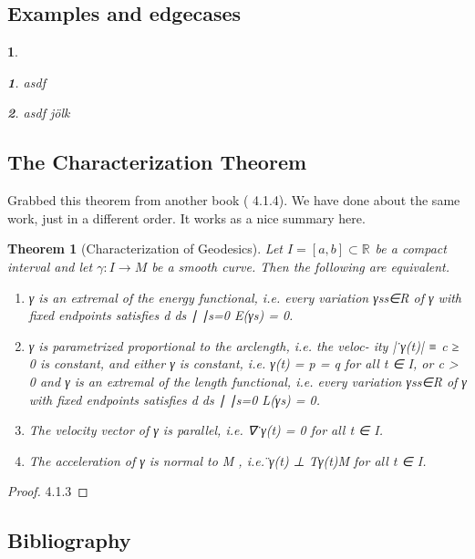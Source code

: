 \documentclass{article}
\newtheorem{thm}{Theorem}
\newtheorem{proof}{Proof}
\newtheorem*{variants}{}
\newtheorem*{var}{}
\renewcommand{\Rn}[1][n]{\mathbb{R}^{#1}}
\begin{document}
\subsection{Examples and edgecases}

\begin{variants}
    \begin{var}
        \label{ Hyperbolic space }
        asdf
    \end{var}
    \begin{var}
        \label{ Projective space}
        asdf jölk
    \end{var}
\end{variants}



\subsection{The Characterization Theorem}

Grabbed this theorem from another book (\cite{salamon} 4.1.4).
We have done about the same work, just in a different order.
It works as a nice summary here.

\begin{thm}[Characterization of Geodesics]
    Let $I = [a, b] \subset \Rn[]$ be a compact interval and let $\gamma : I \rightarrow M$ be a
    smooth curve. Then the following are equivalent.
    \begin{enumerate}
    \item γ is an extremal of the energy functional, i.e. every variation {γs}s∈R
        of γ with fixed endpoints satisfies
        d
        ds
        ∣
        ∣s=0 E(γs) = 0.
    \item γ is parametrized proportional to the arclength, i.e. the veloc-
        ity |  ̇γ(t)| ≡ c ≥ 0 is constant, and either γ is constant, i.e. γ(t) = p = q for
        all t ∈ I, or c > 0 and γ is an extremal of the length functional, i.e.
        every variation {γs}s∈R of γ with fixed endpoints satisfies
        d
        ds
        ∣
        ∣s=0 L(γs) = 0.
    \item The velocity vector of γ is parallel, i.e. ∇  ̇γ(t) = 0 for all t ∈ I.
    \item The acceleration of γ is normal to M , i.e.  ̈γ(t) ⊥ Tγ(t)M for all t ∈ I.
    \end{enumerate}
\end{thm}


\begin{proof}
    \cite{salamon} 4.1.3
\end{proof}


\subsection{Bibliography}

\printbibliography
\end{document}
